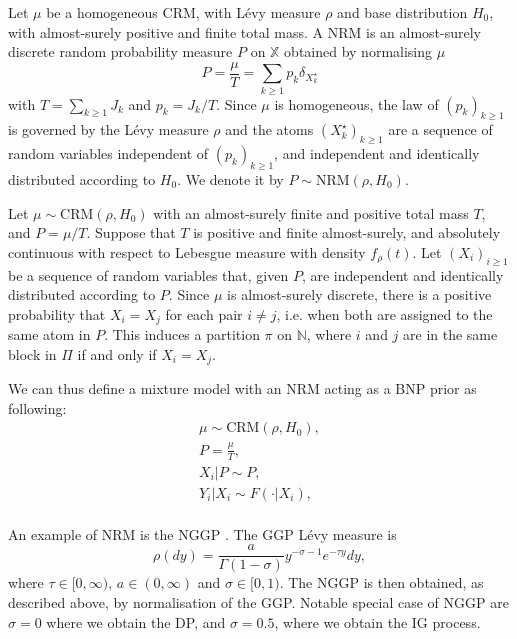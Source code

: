 \begin{definition} \label{def:NRM}
Let $\mu$ be a homogeneous \gls{CRM}, with Lévy measure $\rho$ and base distribution $H_0$, with almost-surely positive and finite total mass. A \gls{NRM} is an almost-surely discrete random probability measure $P$ on $\mathbb{X}$ obtained by normalising $\mu$
$$ P = \frac{\mu}{T} = \sum_{k \ge 1}{p_k \delta_{X^\star_k}} $$
with $T = \sum_{k \ge 1}{J_k}$ and $p_k = J_k / T$.
Since $\mu$ is homogeneous, the law of $\left(p_k \right)_{k \ge 1}$ is governed by the Lévy measure $\rho$ and the atoms $\left(X^\star_k \right)_{k \ge 1}$ are a sequence of random variables independent of $\left(p_k \right)_{k \ge 1}$, and independent and identically distributed according to $H_0$.
We denote it by $P \sim \text{NRM}(\rho, H_0)$. \\
\end{definition}

Let $\mu \sim \text{CRM}(\rho, H_0)$ with an almost-surely finite and positive total mass $T$, and $P = \mu / T$. Suppose that $T$ is positive and finite almost-surely, and absolutely continuous with respect to Lebesgue measure with density $f_\rho(t)$.
Let $(X_i)_{i \ge 1}$ be a sequence of random variables that, given $P$, are independent and identically distributed according to $P$. Since $\mu$ is almost-surely discrete, there is a positive probability that $X_i = X_j$ for each pair $i \neq j$, i.e. when both are assigned to the same atom in $P$. This induces a partition $\pi$ on $\mathbb{N}$, where $i$ and $j$ are in the same block in $\Pi$ if and only if $X_i = X_j$.

We can thus define a mixture model with an \gls{NRM} acting as a \gls{BNP} prior as following:
\begin{gather*}
\mu \sim \text{CRM}(\rho, H_0), \\
P = \frac{\mu}{T}, \\
X_i|P \sim P, \\
Y_i|X_i \sim F(\cdot|X_i), \\
\end{gather*}

An example of \gls{NRM} is the \gls{NGGP} \cite{pitman2003pkp,Lijoi:2007}. The \gls{GGP} Lévy measure is
\begin{equation} \label{eq:GGP}
\rho(dy) = \frac{a}{\Gamma(1 - \sigma)}y^{-\sigma-1}e^{-\tau y} dy,
\end{equation}
where $\tau \in [0,\infty)$, $a \in (0, \infty)$ and $\sigma \in [0, 1)$. The \gls{NGGP} is then obtained, as described above, by normalisation of the \gls{GGP}. Notable special case of \gls{NGGP} are $\sigma = 0$ where we obtain the \gls{DP}, and $\sigma=0.5$, where we obtain the \gls{IG} process.

